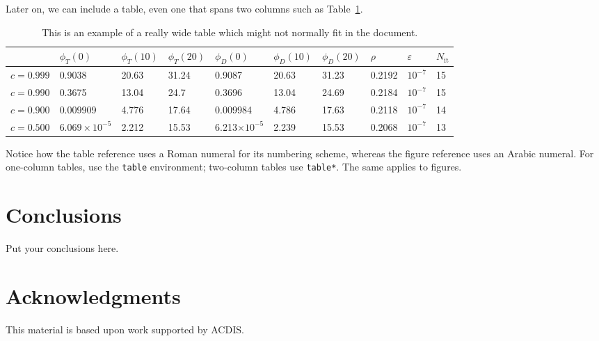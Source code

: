 \documentclass{anstrans}
\begin{document}
Later on, we can include a table, even one that spans two columns such as
Table~\ref{tab:widetable}.
\begin{table}[htb]
  \centering
\begin{tabular}{llllllllll}\toprule
      & $\phi_T(0)$      & $\phi_T(10)$      & $\phi_T(20)$      &
      $\phi_D(0)$      & $\phi_D(10)$      & $\phi_D(20)$      & $\rho$      &
      $\varepsilon$      & $N_\text{it}$
\\ \midrule
$c=0.999$  & 0.9038 & 20.63 & 31.24 & 0.9087 & 20.63 & 31.23 & 0.2192 & $10^{-7}$ & 15
\\
$c=0.990$  & 0.3675 & 13.04 & 24.7 & 0.3696 & 13.04 & 24.69 & 0.2184 & $10^{-7}$ & 15
\\
$c=0.900$  & 0.009909 & 4.776 & 17.64 & 0.009984 & 4.786 & 17.63 & 0.2118 & $10^{-7}$ & 14
\\
$c=0.500$  & $6.069\times 10^{-5}$ & 2.212 & 15.53 & 6.213$\times 10^{-5}$ & 2.239 & 15.53 & 0.2068 & $10^{-7}$ & 13
\\
\bottomrule
\end{tabular}
  \caption{This is an example of a really wide table which might not normally
  fit in the document.}
  \label{tab:widetable}
\end{table}
Notice how the table reference uses a Roman numeral
for its numbering scheme, whereas the figure reference uses an Arabic numeral.
For one-column tables, use the \verb|table| environment; two-column tables use
\verb|table*|. The same applies to figures.

\section{Conclusions}

Put your conclusions here. 

\section{Acknowledgments}

This material is based upon work supported by ACDIS.



\end{document}
